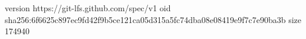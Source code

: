 version https://git-lfs.github.com/spec/v1
oid sha256:6f6625c897ec9fd42f9b5ce121ca05d315a5fc74dba08e08419e9f7c7e90ba3b
size 174940
